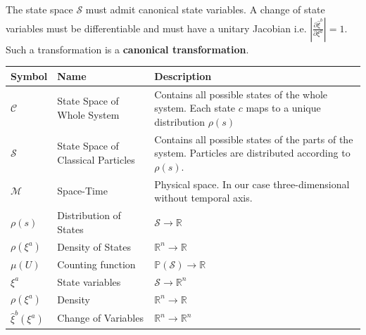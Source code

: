 \documentclass{article}
\begin{document}
	
\begin{prop}
	The state space $\mathcal{S}$ must admit canonical state variables. A change of state variables must be differentiable and must have a unitary Jacobian i.e. $\left|\frac{\partial\hat{\xi}^b}{\partial\xi^a}\right| = 1$. Such a transformation is a \textbf{canonical transformation}.
\end{prop}

\begin{center}
\renewcommand{\arraystretch}{1.6}
 \begin{tabular}{p{} p{} p{}}
 \hline
 Symbol & Name & Description \\ [0.5ex] 
 \hline\hline
 $\mathcal{C}$ & State Space of Whole System & Contains all possible states of the whole system. Each state $c$ maps to a unique distribution $\rho(s)$\\ [2ex]
 \hline
 $\mathcal{S}$ & State Space of Classical Particles & Contains all possible states of the parts of the system. Particles are distributed according to $\rho(s)$. \\ [2ex]
 \hline
 $\mathcal{M}$ & Space-Time & Physical space. In our case three-dimensional without temporal axis. \\ [1ex] 
 \hline
 $\rho(s)$ & Distribution of States & $\mathcal{S} \to \mathbb{R}$ \\
 \hline
 $\rho(\xi^a)$ & Density of States & $\mathbb{R}^n \to \mathbb{R}$ \\
 \hline
 $\mu(U)$ & Counting function & $\mathbb{P}(\mathcal{S}) \to \mathbb{R}$ \\
 \hline
 $\xi^a$ & State variables & $\mathcal{S} \to \mathbb{R}^n$ \\
 \hline
 $\rho(\xi^a)$ & Density & $\mathbb{R}^n \to \mathbb{R}$ \\
 \hline
 $\hat{\xi}^b(\xi^a)$ & Change of Variables & $\mathbb{R}^n \to \mathbb{R}^n$ \\ [1ex] 
 \hline
\end{tabular}
\end{center}
\end{document}
